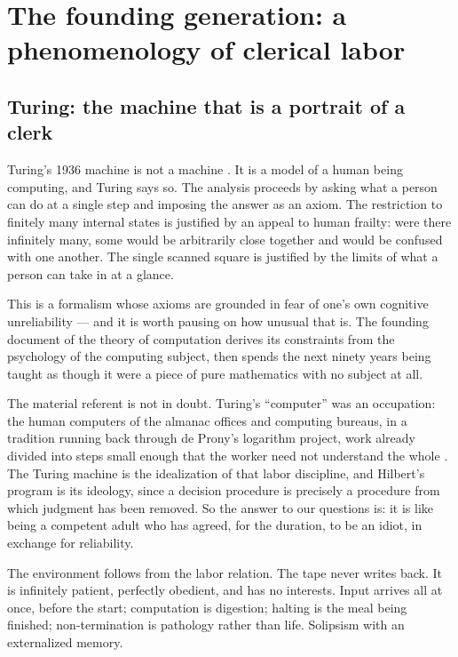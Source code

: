 \section{The founding generation: a phenomenology of clerical labor}
\label{psy:sec:founding}

\subsection{Turing: the machine that is a portrait of a clerk}
\label{psy:sec:turing}

Turing's 1936 machine is not a machine \cite{turing1936}.
It is a model of a human being computing, and Turing says so.
The analysis proceeds by asking what a person can do at a single
step and imposing the answer as an axiom.
The restriction to finitely many internal states is justified by an
appeal to human frailty: were there infinitely many, some would be
arbitrarily close together and would be confused with one another.
The single scanned square is justified by the limits of what a
person can take in at a glance.

This is a formalism whose axioms are grounded in fear of one's own
cognitive unreliability --- and it is worth pausing on how unusual
that is.
The founding document of the theory of computation derives its
constraints from the psychology of the computing subject, then
spends the next ninety years being taught as though it were a piece
of pure mathematics with no subject at all.

The material referent is not in doubt.
Turing's ``computer'' was an occupation: the human computers of the
almanac offices and computing bureaus, in a tradition running back
through de Prony's logarithm project, work already divided into
steps small enough that the worker need not understand the whole
\cite{grier2005,daston1994}.
The Turing machine is the idealization of that labor discipline, and
Hilbert's program is its ideology, since a decision procedure is
precisely a procedure from which judgment has been removed.
So the answer to our questions is: it is like being a competent
adult who has agreed, for the duration, to be an idiot, in exchange
for reliability.

The environment follows from the labor relation.
The tape never writes back.
It is infinitely patient, perfectly obedient, and has no interests.
Input arrives all at once, before the start; computation is
digestion; halting is the meal being finished; non-termination is
pathology rather than life.
Solipsism with an externalized memory.

